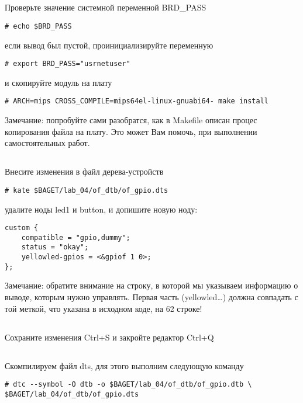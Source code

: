 \subsection{}Проверьте значение системной переменной BRD\_PASS  
\begin{lstlisting}[style=bash]
# echo $BRD_PASS
\end{lstlisting}
если вывод был пустой, проинициализируйте переменную 
\begin{lstlisting}[style=bash]
# export BRD_PASS="usrnetuser" 
\end{lstlisting}
и скопируйте модуль на плату
\begin{lstlisting}[style=bash]
# ARCH=mips CROSS_COMPILE=mips64el-linux-gnuabi64- make install
\end{lstlisting}
Замечание: попробуйте сами разобратся, как в Makefile описан процес копирования файла на плату. Это может Вам помочь, при выполнении самостоятельных работ.

\subsection{}Внесите изменения в файл дерева-устройств 
\begin{lstlisting}[style=bash]
# kate $BAGET/lab_04/of_dtb/of_gpio.dts
\end{lstlisting}
удалите ноды led1 и button, и допишите новую ноду:
\begin{lstlisting}[style=stdout]
custom {
	compatible = "gpio,dummy";
	status = "okay";
	yellowled-gpios = <&gpiof 1 0>;
};
\end{lstlisting}
Замечание: обратите внимание на строку, в которой мы указываем информацию о выводе, которым нужно управлять. Первая часть (yellowled…) должна совпадать с той меткой, что указана в исходном коде, на 62 строке!

\subsection{}Сохраните изменения Ctrl+S и закройте редактор Ctrl+Q 

\subsection{}Скомпилируем файл dts, для этого выполним следующую команду
\begin{lstlisting}[style=bash]
# dtc --symbol -O dtb -o $BAGET/lab_04/of_dtb/of_gpio.dtb \
$BAGET/lab_04/of_dtb/of_gpio.dts
\end{lstlisting}

